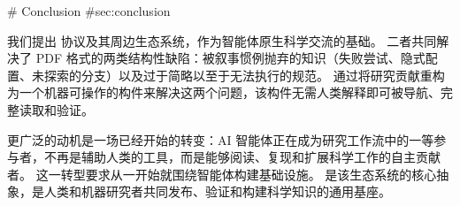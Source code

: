 \begin{markdown}
# Conclusion {#sec:conclusion}

我们提出 \ara{} 协议及其周边生态系统，作为智能体原生科学交流的基础。
二者共同解决了 PDF 格式的两类结构性缺陷：被叙事惯例抛弃的知识（失败尝试、隐式配置、未探索的分支）以及过于简略以至于无法执行的规范。
\ara{} 通过将研究贡献重构为一个机器可操作的构件来解决这两个问题，该构件无需人类解释即可被导航、完整读取和验证。

更广泛的动机是一场已经开始的转变：AI 智能体正在成为研究工作流中的一等参与者，不再是辅助人类的工具，而是能够阅读、复现和扩展科学工作的自主贡献者。
这一转型要求从一开始就围绕智能体构建基础设施。
\ara{} 是该生态系统的核心抽象，是人类和机器研究者共同发布、验证和构建科学知识的通用基座。
\end{markdown}
